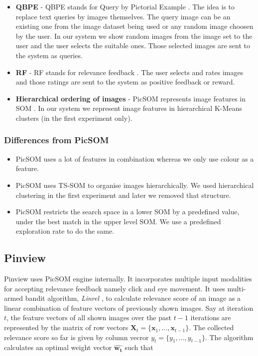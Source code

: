 \documentclass[english]{tktltiki}
\begin{document}
\begin{itemize}
	\item \textbf{QBPE} - QBPE stands for Query by Pictorial Example \cite{qbpe}. The idea is to replace text queries by images themselves. The query image can be an existing one from the image dataset being used or any random image choosen by the user. In our system we show random images from the image set to the user and the user selects the suitable ones. Those selected images are sent to the system as queries.
	\item \textbf{RF} - RF stands for relevance feedback \cite{rel_feed}. The user selects and rates images and those ratings are sent to the system as positive feedback or reward.
	\item \textbf{Hierarchical ordering of images} - PicSOM represents image features in SOM \cite{SOM}. In our system we represent image features in hierarchical K-Means \cite{k_means} clusters (in the first experiment only).
\end{itemize}

\subsubsection{Differences from PicSOM}

\begin{itemize}
	\item PicSOM uses a lot of features in combination whereas we only use colour as a feature.
	\item PicSOM uses TS-SOM to organise images hierarchically. We used hierarchical clustering in the first experiment and later we removed that structure.
	\item PicSOM restricts the search space in a lower SOM by a predefined value, under the best match in the upper level SOM. We use a predefined exploration rate to do the same.
\end{itemize}


\subsection{Pinview}

Pinview uses PicSOM engine internally. It incorporates multiple input modalities for accepting relevance feedback namely click and eye movement. It uses multi-armed bandit algorithm, \textit{Linrel} \cite{linrel}, to calculate relevance score of an image as a linear combination of feature vectors of previously shown images. Say at iteration $t$, the feature vectors of all shown images over the past $t-1$ iterations are represented by the matrix of row vectors $\mathbf{X}_t = \{\mathbf{x}_1, ..., \mathbf{x}_{t-1}\}$. The collected relevance score so far is given by column vecror $y_t = \{y_1, ..., y_{t-1}\}$. The algorithm calculates an optimal weight vector $\hat{\mathbf{w_t}}$ such that
\end{document}
